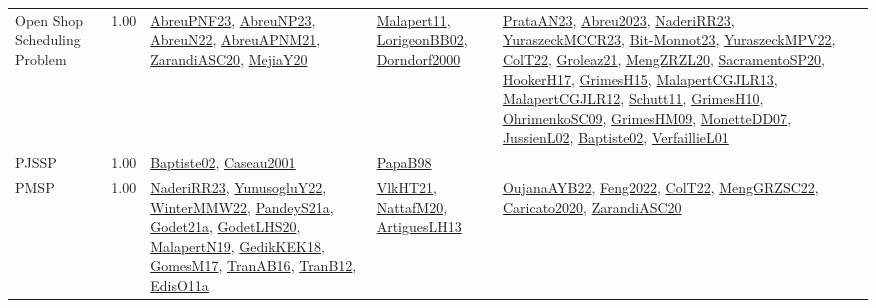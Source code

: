 {\begin{longtable}{p{3cm}r>{\raggedright\arraybackslash}p{6cm}>{\raggedright\arraybackslash}p{6cm}>{\raggedright\arraybackslash}p{8cm}}
\index{Open Shop Scheduling Problem}\index{Classification!Open Shop Scheduling Problem}Open Shop Scheduling Problem &  1.00 & \hyperref[detail:AbreuPNF23]{AbreuPNF23}, \hyperref[detail:AbreuNP23]{AbreuNP23}, \hyperref[detail:AbreuN22]{AbreuN22}, \hyperref[detail:AbreuAPNM21]{AbreuAPNM21}, \hyperref[detail:ZarandiASC20]{ZarandiASC20}, \hyperref[detail:MejiaY20]{MejiaY20} & \hyperref[detail:Malapert11]{Malapert11}, \hyperref[detail:LorigeonBB02]{LorigeonBB02}, \hyperref[detail:Dorndorf2000]{Dorndorf2000} & \hyperref[detail:PrataAN23]{PrataAN23}, \hyperref[detail:Abreu2023]{Abreu2023}, \hyperref[detail:NaderiRR23]{NaderiRR23}, \hyperref[detail:YuraszeckMCCR23]{YuraszeckMCCR23}, \hyperref[detail:Bit-Monnot23]{Bit-Monnot23}, \hyperref[detail:YuraszeckMPV22]{YuraszeckMPV22}, \hyperref[detail:ColT22]{ColT22}, \hyperref[detail:Groleaz21]{Groleaz21}, \hyperref[detail:MengZRZL20]{MengZRZL20}, \hyperref[detail:SacramentoSP20]{SacramentoSP20}, \hyperref[detail:HookerH17]{HookerH17}, \hyperref[detail:GrimesH15]{GrimesH15}, \hyperref[detail:MalapertCGJLR13]{MalapertCGJLR13}, \hyperref[detail:MalapertCGJLR12]{MalapertCGJLR12}, \hyperref[detail:Schutt11]{Schutt11}, \hyperref[detail:GrimesH10]{GrimesH10}, \hyperref[detail:OhrimenkoSC09]{OhrimenkoSC09}, \hyperref[detail:GrimesHM09]{GrimesHM09}, \hyperref[detail:MonetteDD07]{MonetteDD07}, \hyperref[detail:JussienL02]{JussienL02}, \hyperref[detail:Baptiste02]{Baptiste02}, \hyperref[detail:VerfaillieL01]{VerfaillieL01}\\
\index{PJSSP}\index{Classification!PJSSP}PJSSP &  1.00 & \hyperref[detail:Baptiste02]{Baptiste02}, \hyperref[detail:Caseau2001]{Caseau2001} & \hyperref[detail:PapaB98]{PapaB98} & \\
\index{PMSP}\index{Classification!PMSP}PMSP &  1.00 & \hyperref[detail:NaderiRR23]{NaderiRR23}, \hyperref[detail:YunusogluY22]{YunusogluY22}, \hyperref[detail:WinterMMW22]{WinterMMW22}, \hyperref[detail:PandeyS21a]{PandeyS21a}, \hyperref[detail:Godet21a]{Godet21a}, \hyperref[detail:GodetLHS20]{GodetLHS20}, \hyperref[detail:MalapertN19]{MalapertN19}, \hyperref[detail:GedikKEK18]{GedikKEK18}, \hyperref[detail:GomesM17]{GomesM17}, \hyperref[detail:TranAB16]{TranAB16}, \hyperref[detail:TranB12]{TranB12}, \hyperref[detail:EdisO11a]{EdisO11a} & \hyperref[detail:VlkHT21]{VlkHT21}, \hyperref[detail:NattafM20]{NattafM20}, \hyperref[detail:ArtiguesLH13]{ArtiguesLH13} & \hyperref[detail:OujanaAYB22]{OujanaAYB22}, \hyperref[detail:Feng2022]{Feng2022}, \hyperref[detail:ColT22]{ColT22}, \hyperref[detail:MengGRZSC22]{MengGRZSC22}, \hyperref[detail:Caricato2020]{Caricato2020}, \hyperref[detail:ZarandiASC20]{ZarandiASC20}\\

\end{longtable}}
